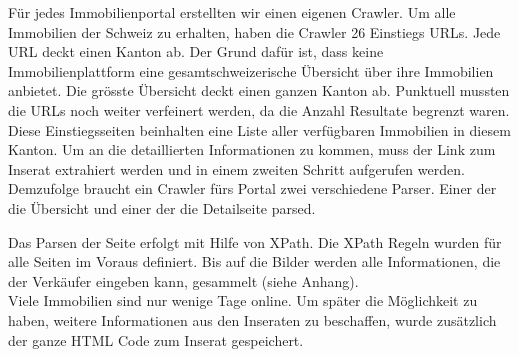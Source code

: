 Für jedes Immobilienportal erstellten wir einen eigenen Crawler. Um alle Immobilien der Schweiz zu erhalten, haben die Crawler 26 Einstiegs URLs. Jede URL deckt einen Kanton ab. Der Grund dafür ist, dass keine Immobilienplattform eine gesamtschweizerische Übersicht über ihre Immobilien anbietet. Die grösste Übersicht deckt einen ganzen Kanton ab. Punktuell mussten die URLs noch weiter verfeinert werden, da die Anzahl Resultate begrenzt waren.\\
Diese Einstiegsseiten beinhalten eine Liste aller verfügbaren Immobilien in diesem Kanton. Um an die detaillierten Informationen zu kommen, muss der Link zum Inserat extrahiert werden und in einem zweiten Schritt aufgerufen werden.
Demzufolge braucht ein Crawler fürs Portal zwei verschiedene Parser. Einer der die Übersicht und einer der die Detailseite parsed.

Das Parsen der Seite erfolgt mit Hilfe von XPath. Die XPath Regeln wurden für alle Seiten im Voraus definiert. Bis auf die Bilder werden alle Informationen, die der Verkäufer eingeben kann, gesammelt (siehe Anhang).\\
Viele Immobilien sind nur wenige Tage online. Um später die Möglichkeit zu haben, weitere Informationen aus den Inseraten zu beschaffen, wurde zusätzlich der ganze HTML Code zum Inserat gespeichert.

